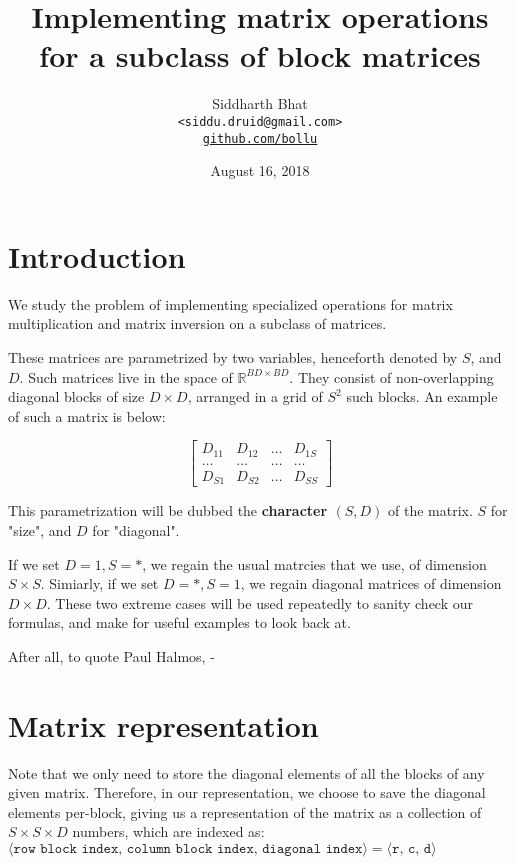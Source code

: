 \documentclass[11pt]{article}
\title{Implementing matrix operations for a subclass of block matrices}
\author{Siddharth Bhat \\ 
    \texttt{<siddu.druid@gmail.com>} \\ 
    \href{http://www.github.com/bollu}{\texttt{github.com/bollu}}
}
\date{August 16, 2018}
\begin{document}
\newcommand{\bigO}{\mathcal{O}}
\maketitle

\section{Introduction}

We study the problem of implementing specialized operations for 
matrix multiplication and matrix inversion on a subclass of matrices.

These matrices are parametrized by two variables, henceforth denoted by
$S$, and $D$. Such matrices live in the space of $\mathbb{R}^{BD \times BD}$.
They consist of non-overlapping diagonal blocks of size $D \times D$, arranged
in a grid of $S^2$ such blocks. An example of such a matrix is below:

$$
\begin{bmatrix}
    D_{11} & D_{12} &\dots & D_{1S} \\
    \dots & \dots   & \dots & \dots \\
    D_{S1} & D_{S2} & \dots &  D_{SS} 
\end{bmatrix}
$$

This parametrization will be dubbed the \textbf{character $(S, D)$} of the matrix.
$S$ for "size", and $D$ for "diagonal". 

If we set $D = 1, S = *$, we regain the usual matrcies that we use, of dimension
$S \times S$. Simiarly, if we set $D = *, S = 1$, we regain diagonal matrices
of dimension $D \times D$. These two extreme cases will be used repeatedly to
sanity check our formulas, and make for useful examples to look back at. 

After all, to quote Paul Halmos, - 


\section{Matrix representation}
Note that we only need to store the diagonal elements of all the blocks of any
given matrix. Therefore, in our representation, we choose to save the diagonal
elements per-block, giving us a representation of the matrix as a collection of
$S \times S \times D$ numbers, which are indexed as:
$\langle\texttt{row block index, column block index, diagonal index} \rangle = \langle \texttt{r, c, d} \rangle$
\end{document}
